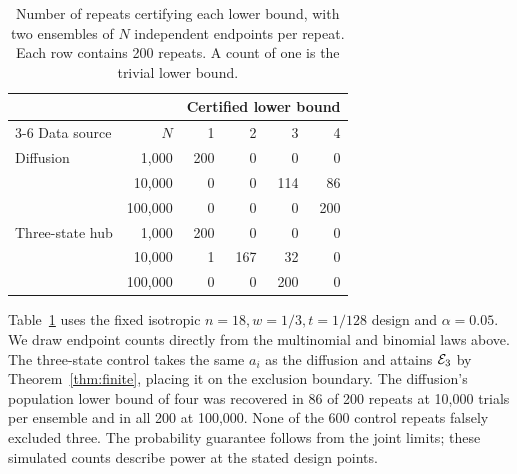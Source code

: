 \begin{table}[htbp]
\centering
\caption{Number of repeats certifying each lower bound, with two ensembles of \(N\) independent endpoints per repeat. Each row contains 200 repeats. A count of one is the trivial lower bound.}
\label{tab:counts}
\begin{tabular}{lr rrrr}
\toprule
&&\multicolumn{4}{c}{Certified lower bound}\\
\cmidrule(l){3-6}
Data source & \(N\) & 1 & 2 & 3 & 4\\
\midrule
Diffusion & 1,000   & 200 & 0   & 0   & 0\\
           & 10,000  & 0   & 0   & 114 & 86\\
           & 100,000 & 0   & 0   & 0   & 200\\
\addlinespace
Three-state hub & 1,000   & 200 & 0   & 0   & 0\\
                & 10,000  & 1   & 167 & 32  & 0\\
                & 100,000 & 0   & 0   & 200 & 0\\
\bottomrule
\end{tabular}
\end{table}

Table~\ref{tab:counts} uses the fixed isotropic \(n=18,w=1/3,t=1/128\) design and \(\alpha=0.05\). We draw endpoint counts directly from the multinomial and binomial laws above. The three-state control takes the same \(a_i\) as the diffusion and attains \(\mathcal E_3\) by Theorem~\ref{thm:finite}, placing it on the exclusion boundary. The diffusion's population lower bound of four was recovered in 86 of 200 repeats at 10,000 trials per ensemble and in all 200 at 100,000. None of the 600 control repeats falsely excluded three. The probability guarantee follows from the joint limits; these simulated counts describe power at the stated design points.
